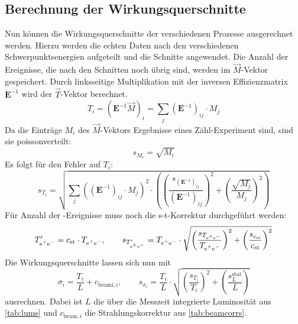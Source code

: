 \subsection{Berechnung der Wirkungsquerschnitte}
Nun können die Wirkungsquerschnitte der verschiedenen Prozesse ausgerechnet werden. Hierzu werden die echten Daten nach den verschiedenen
Schwerpunktsenergien aufgeteilt und die Schnitte angewendet. Die Anzahl der Ereignisse, die nach den Schnitten
noch übrig sind, werden im $\vec{M}$-Vektor gespeichert. Durch linksseitige Multiplikation mit der inversen Effizienzmatrix $\bm{E}^{-1}$
wird der $\vec{T}$-Vektor berechnet.
\begin{equation}
    T_i = \left( \bm{E}^{-1} \vec{M} \right)_i = \sum_j (\bm{E}^{-1})_{ij} \cdot M_j
\end{equation}
Da die Einträge $M_i$ des $\vec{M}$-Vektors Ergebnisse eines Zähl-Experiment sind, sind sie poissonverteilt:
\begin{equation}
    s_{M_i} = \sqrt{M_i}
\end{equation}
Es folgt für den Fehler auf $T_i$:
\begin{equation}
    s_{T_i} = \sqrt{\sum_j \left( (\bm{E}^{-1})_{ij} \cdot M_j \right)^2 \cdot
    \left( \left( \frac{s_{(\bm{E}^{-1})_{ij}}}{(\bm{E}^{-1})_{ij}} \right)^2 + \left( \frac{\sqrt{M_j}}{M_j} \right)^2 \right) }
\end{equation}
Für Anzahl der \ee -Ereignisse muss noch die s-t-Korrektur durchgeführt werden:
\begin{equation}
    T_\text{e$^+$e$^-$}' = c_\text{st} \cdot T_\text{e$^+$e$^-$}, \qquad
    s_{T_\text{e$^+$e$^-$}'} = T_\text{e$^+$e$^-$} \cdot \sqrt{ \left( \frac{s_{T_\text{e$^+$e$^-$}}}{T_\text{e$^+$e$^-$}} \right)^2 + \left( \frac{s_{c_\text{st}}}{c_\text{st}} \right)^2 }
\end{equation}
Die Wirkungsquerschnitte lassen sich nun mit
\begin{equation}
    \sigma_i = \frac{T_i}{L} + c_{\text{beami}, i}, \qquad
    s_{\sigma_i} = \frac{T_i}{L} \cdot \sqrt{ \left( \frac{s_{T_i}}{T_i} \right)^2 + \left( \frac{s_L^\text{stat}}{L} \right) }
\end{equation}
ausrechnen. Dabei ist $L$ die über die Messzeit integrierte Luminosität aus \autoref{tab:lums}
und $c_{\text{beam}, i}$ die Strahlungskorrektur aus \autoref{tab:beamcorrs}.

